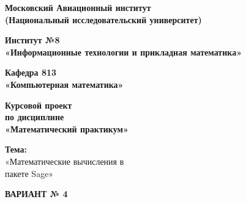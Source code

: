 \thispagestyle{empty}  %

\begin{center}
\textbf{
Московский Авиационный институт \\
(Национальный исследовательский университет)
}
\end{center}

\vspace{0.25em}
\begin{center}
\Large \textbf{ Институт №8 }\\
\large \textbf{ «Информационные технологии и прикладная математика» }\\
\end{center}

\vspace{0.25em}
\begin{center}
	\large \textbf {Кафедра 813 \\
	«Компьютерная математика» }\\
\end{center}

\vspace{0.25em}
\begin{center}
\large \textbf{Курсовой проект \\
по дисциплине \\
«Математический практикум»\\}
\end{center}

\vspace{0.25em}
\begin{center}
	\Large \textbf{Тема:}\\
	\large«Математические вычисления в \\
	пакете Sage»
\end{center}

\vspace{0.5em}
\begin{center}
\Large \textbf{ВАРИАНТ № 4}\\
\end{center}

